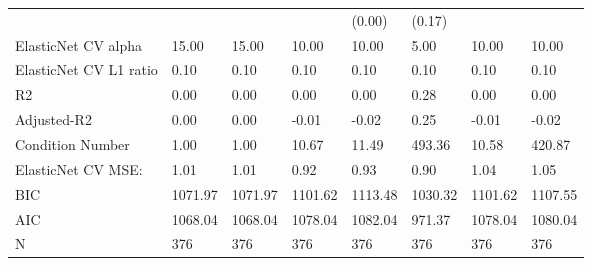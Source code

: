 \begin{table}
\begin{center}
\begin{tabular}{llllllll}
                                               &         &         &         & (0.00)  & (0.17)   &           &          \\
ElasticNet CV alpha                            & 15.00   & 15.00   & 10.00   & 10.00   & 5.00     & 10.00     & 10.00    \\
ElasticNet CV  L1 ratio                        & 0.10    & 0.10    & 0.10    & 0.10    & 0.10     & 0.10      & 0.10     \\
R2                                             & 0.00    & 0.00    & 0.00    & 0.00    & 0.28     & 0.00      & 0.00     \\
Adjusted-R2                                    & 0.00    & 0.00    & -0.01   & -0.02   & 0.25     & -0.01     & -0.02    \\
Condition Number                               & 1.00    & 1.00    & 10.67   & 11.49   & 493.36   & 10.58     & 420.87   \\
ElasticNet CV MSE:                             & 1.01    & 1.01    & 0.92    & 0.93    & 0.90     & 1.04      & 1.05     \\
BIC                                            & 1071.97 & 1071.97 & 1101.62 & 1113.48 & 1030.32  & 1101.62   & 1107.55  \\
AIC                                            & 1068.04 & 1068.04 & 1078.04 & 1082.04 & 971.37   & 1078.04   & 1080.04  \\
N                                              & 376     & 376     & 376     & 376     & 376      & 376       & 376      \\
\hline
\end{tabular}
\end{center}
\end{table}
